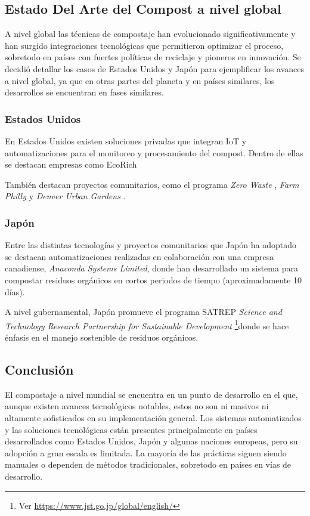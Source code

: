 \subsection{Estado Del Arte del Compost a nivel global}
\label{sec:EstadoArteGlobal}

A nivel global las técnicas de compostaje han evolucionado significativamente y han surgido integraciones tecnológicas que permitieron optimizar el proceso, sobretodo en países con fuertes políticas de reciclaje y pioneros en innovación.
Se decidió detallar los casos de Estados Unidos y Japón para ejemplificar los avances a nivel global, ya que en otras partes del planeta y en países similares, los desarrollos se encuentran en fases similares.

\subsubsection{Estados Unidos}
En Estados Unidos existen soluciones privadas que integran IoT y automatizaciones para el monitoreo y procesamiento del compost. Dentro de ellas se destacan empresas como EcoRich \citep{ECORICH}

También destacan proyectos comunitarios, como el programa \textit{Zero Waste} \citep{ZeroWaste}, \textit{Farm Philly} \citep{FarmPhilly} y \textit{Denver Urban Gardens} \citep{DenverUrban}.

\subsubsection{Japón}
Entre las distintas tecnologías y proyectos comunitarios que Japón ha adoptado se destacan automatizaciones realizadas en colaboración con una empresa canadiense, \textit{Anaconda Systems Limited}\citep{Anaconda}, donde han desarrollado un sistema para compostar residuos orgánicos en cortos periodos de tiempo (aproximadamente 10 días).

A nivel gubernamental, Japón promueve el programa SATREP \textit{Science and Technology Research Partnership for Sustainable Development} \footnote{Ver \url{https://www.jst.go.jp/global/english/}}donde se hace énfasis en el manejo sostenible de residuos orgánicos.

\subsection{Conclusión}
El compostaje a nivel mundial se encuentra en un punto de desarrollo en el que, aunque existen avances tecnológicos notables, estos no son ni masivos ni altamente sofisticados en su implementación general. Los sistemas automatizados y las soluciones tecnológicas están presentes principalmente en países desarrollados como Estados Unidos, Japón y algunas naciones europeas, pero su adopción a gran escala es limitada. La mayoría de las prácticas siguen siendo manuales o dependen de métodos tradicionales, sobretodo en países en vías de desarrollo.

